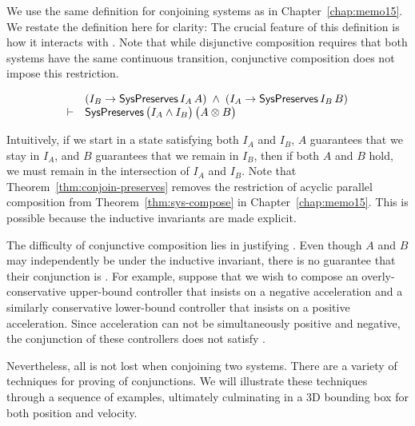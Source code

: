 We use the same definition for conjoining systems as in Chapter~\ref{chap:memo15}.
We restate the definition here for clarity:
\sysconjoin*
The crucial feature of this definition is how it interacts
with \SysPreserves.  Note that while disjunctive composition requires that
both systems have the same continuous transition, conjunctive composition
does not impose this restriction.
\begin{theorem}{}
\[\begin{array}{rl}
       & (I_B \rightarrow \mathsf{SysPreserves}\,I_A\,A) \;\wedge\; (I_A \rightarrow \mathsf{SysPreserves}\,I_B\,B) \\
\vdash & \mathsf{SysPreserves}\,\big(I_A \wedge I_B\big)\,\big(A \otimes B\big)
\end{array}
\]
\label{thm:conjoin-preserves}
\end{theorem}
Intuitively, if we start in a state satisfying both $I_A$ and $I_B$, $A$
guarantees that we stay in $I_A$, and $B$ guarantees that we remain in
$I_B$, then if both $A$ and $B$ hold, we must remain in the intersection of
$I_A$ and $I_B$. Note that Theorem~\ref{thm:conjoin-preserves} removes the
restriction of acyclic parallel composition from
Theorem~\ref{thm:sys-compose} in Chapter~\ref{chap:memo15}. This is
possible because the inductive invariants are made explicit.

The difficulty of conjunctive composition lies in justifying \progress{}.
Even though $A$ and $B$ may independently be \Enabled under the inductive
invariant, there is no guarantee that their conjunction is \Enabled.  For
example, suppose that we wish to compose an overly-conservative upper-bound
controller that insists on a negative acceleration and a similarly
conservative lower-bound controller that insists on a positive
acceleration.  Since acceleration can not be simultaneously positive and
negative, the conjunction of these controllers does not
satisfy \progress{}.

Nevertheless, all is not lost when conjoining two systems.  There are a
variety of techniques for proving \Enabledness of conjunctions.  We will
illustrate these techniques through a sequence of examples, ultimately
culminating in a 3D bounding box for both position and velocity.

